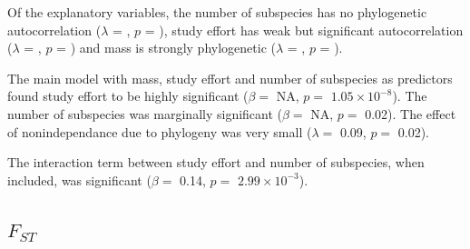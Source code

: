 Of the explanatory variables, the number of subspecies has no phylogenetic autocorrelation ($\lambda$ = , $p$ = ), study effort has weak but significant autocorrelation ($\lambda$ = , $p$ = ) and mass is strongly phylogenetic ($\lambda$ = , $p$ = ).

The main model with mass, study effort and number of subspecies as predictors found study effort to be highly significant ($\beta = $ NA, $p = $ \ensuremath{1.05\times 10^{-8}}). 
The number of subspecies was marginally significant ($\beta = $ NA, $p = $ 0.02). 
The effect of nonindependance due to phylogeny was very small ($\lambda = $ 0.09, $p = $ 0.02).

The interaction term between study effort and number of subspecies, when included, was significant ($\beta = $ 0.14, $p = $ \ensuremath{2.99\times 10^{-3}}).



\subsection{$F_{ST}$}













